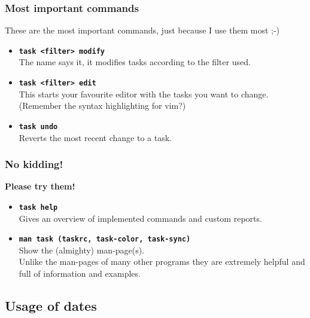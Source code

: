 \documentclass[t,handout,aspectratio=169]{beamer}
\begin{document}
\begin{frame}[fragile]\frametitle{Most important commands}
    \vfill
    These are the most important commands, just because I use them most ;-) \pause

    \begin{itemize}
        \item \textbf{\texttt{task <filter> modify}} \\
        The name says it, it modifies tasks according to the filter used. \pause
        \item \textbf{\texttt{task <filter> edit}} \\
        This starts your favourite editor with the tasks you want to change. \\
        (Remember the syntax highlighting for vim?) \pause
        \item \textbf{\texttt{task undo}} \\
        Reverts the most recent change to a task.
    \end{itemize}
\end{frame}

\begin{frame}[fragile]\frametitle{No kidding!}
    \vfill
    \textbf{Please try them!}
    \begin{itemize}
        \item \textbf{\texttt{task help}} \\
        Gives an overview of implemented commands and custom reports. \pause
        \item \textbf{\texttt{man task (taskrc, task-color, task-sync)}} \\
        Show the (almighty) man-page(s). \\
        Unlike the man-pages of many other programs they are extremely helpful and full of information and examples. \\
    \end{itemize}
\end{frame}

\subsection{Usage of dates}
\end{document}
